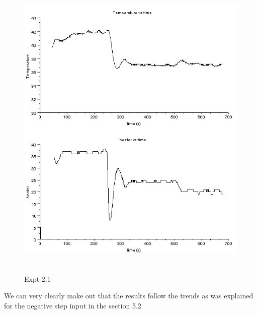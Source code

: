 \begin{figure}[H]
  \includegraphics[width=12cm, height=15cm]{mpc/2_1_heater_final.png}
  \caption{ Expt 2.1}
\end{figure}
We can very clearly make out that the results follow the trends as was explained for the negative step input in the section 5.2


